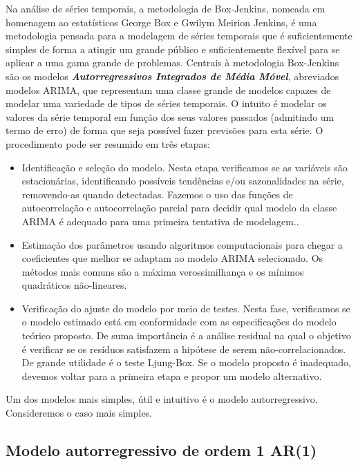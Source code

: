 \documentclass[
]{book}
\theoremstyle{definition}
\theoremstyle{definition}
\theoremstyle{definition}
\theoremstyle{remark}
\begin{document}
Na análise de séries temporais, a metodologia de Box-Jenkins, nomeada em homenagem ao estatísticos
George Box e Gwilym Meirion Jenkins, é uma metodologia pensada para a modelagem de séries temporais que é suficientemente simples de forma a atingir um grande público e suficientemente flexível para se aplicar a uma gama grande de problemas. Centrais à metodologia Box-Jenkins são os modelos \textbf{\emph{Autorregressivos Integrados de Média Móvel}}, abreviados modelos ARIMA, que representam uma classe grande de modelos capazes de modelar uma variedade de tipos de séries temporais. O intuito é modelar os valores da série temporal em função dos seus valores passados (admitindo um termo de erro) de forma que seja possível fazer previsões para esta série.
O procedimento pode ser resumido em três etapas:

\begin{itemize}
\item
  Identificação e seleção do modelo. Nesta etapa verificamos se as variáveis são estacionárias, identificando possíveis tendências e/ou sazonalidades na série, removendo-as quando detectadas. Fazemos o uso das funções de autocorrelação e autocorrelação parcial para decidir qual modelo da classe ARIMA é adequado para uma primeira tentativa de modelagem..
\item
  Estimação dos parâmetros usando algoritmos computacionais para chegar a coeficientes que melhor se adaptam ao modelo ARIMA selecionado. Os métodos mais comuns são a máxima verossimilhança e os mínimos quadráticos não-lineares.
\item
  Verificação do ajuste do modelo por meio de testes. Nesta fase, verificamos se o modelo estimado está em conformidade com as especificações do modelo teórico proposto. De suma importância é a análise residual na qual o objetivo é verificar se os resíduos satisfazem a hipótese de serem não-correlacionados. De grande utilidade é o teste Ljung-Box. Se o modelo proposto é inadequado, devemos voltar para a primeira etapa e propor um modelo alternativo.
\end{itemize}

Um dos modelos mais simples, útil e intuitivo é o modelo autorregressivo. Consideremos o caso mais simples.

\hypertarget{modelo-autorregressivo-de-ordem-1-ar1}{%
\subsection{Modelo autorregressivo de ordem 1 AR(1)}\label{modelo-autorregressivo-de-ordem-1-ar1}}
\end{document}
